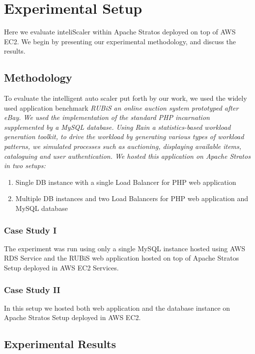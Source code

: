 \section{Experimental Setup}
Here we evaluate inteliScaler within Apache Stratos deployed on top of AWS EC2. We begin by presenting our experimental methodology, and discuss the results. \\

\subsection{Methodology}
To evaluate the intelligent auto scaler put forth by our work, we used the widely used application benchmark \em{RUBiS} an online auction system prototyped after eBay. We used the implementation of the standard PHP incarnation supplemented by a MySQL database. Using \em{Rain} a statistics-based workload generation toolkit, to drive the workload by generating various types of workload patterns, we simulated processes such as auctioning, displaying available items, cataloguing and user authentication. We hosted this application on Apache Stratos in two setups:\\

\begin{enumerate}
\item Single DB instance with a single Load Balancer for PHP web application

\item Multiple DB instances and two Load Balancers for PHP web application and MySQL database

\end{enumerate}

\subsubsection{Case Study I}
The experiment was run using only a single MySQL instance hosted using AWS RDS Service and the RUBiS web application hosted on top of Apache Stratos Setup deployed in AWS EC2 Services. \\

\subsubsection{Case Study II}
In this setup we hosted both web application and the database instance on Apache Stratos Setup deployed in AWS EC2.

\subsection{Experimental Results}